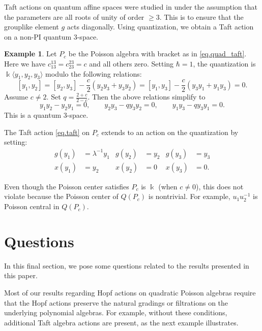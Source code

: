 \documentclass[reqno]{amsart}
\numberwithin{equation}{section}
\theoremstyle{definition}
\newtheorem{example}[theorem]{Example}
\newcommand\inv{^{-1}}
\newcommand\kk{\Bbbk}
\begin{document}
Taft actions on quantum affine spaces were studied in \cite{CG} under the assumption that the parameters are all roots of unity of order $\geq 3$. This is to ensure that the grouplike element $g$ acts diagonally. Using quantization, we obtain a Taft action on a non-PI quantum 3-space.

\begin{example}\label{ex.quant1}
Let $P_c$ be the Poisson algebra with bracket as in \eqref{eq.quad_taft}. Here we have $c_{13}^{13}=c_{23}^{23}=c$ and all others zero. Setting $\hbar=1$, the quantization is $\kk\langle y_1,y_2,y_3\rangle$ modulo the following relations:
\[
[y_1,y_2] =
[y_2,y_3] - \frac{c}{2}(y_2y_3 + y_3y_2) = 
[y_1,y_3] - \frac{c}{2}(y_3y_1 + y_1y_3) = 0.
\]
Assume $c\neq 2$. Set $q=\frac{2+c}{2-c}$. 
Then the above relations simplify to
\[
y_1y_2 - y_2y_1 = 0, \qquad
y_2y_3 - qy_3y_2 = 0, \qquad
y_1y_3 - qy_3y_1 = 0.
\]
This is a quantum 3-space. 

The Taft action \eqref{eq.taft} on $P_c$ 
extends to an action on the quantization by setting:
\begin{align*}
    g(y_1)&=\lambda\inv y_1 & g(y_2)&=y_2 & g(y_3)&=y_3 \\
    x(y_1)&= y_2 & x(y_2)&=0 & x(y_3)&=0.
\end{align*}

Even though the Poisson center satisfies $P_c$ is $\kk$ (when $c \neq 0$), this does not violate \cite[Theorem 3.3]{EW3} because the Poisson center of $Q(P_c)$ is nontrivial. For example, $u_1u_2\inv$ is Poisson central in $Q(P_c)$.
\end{example}

\section{Questions}
In this final section, we pose some questions related to the results presented in this paper.

Most of our results regarding Hopf actions on quadratic Poisson algebras require that the Hopf actions preserve the natural gradings or filtrations on the underlying polynomial algebras. For example, without these conditions, additional Taft algebra actions are present, as the next example illustrates.
\end{document}
